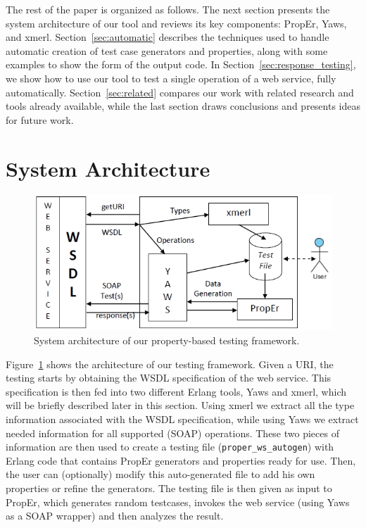 \documentclass[submission,copyright]{eptcs}
\begin{document}

The rest of the paper is organized as follows.
The next section presents the system architecture of our tool and
reviews its key components: PropEr, Yaws, and xmerl.
Section~\ref{sec:automatic} describes the techniques used to handle
automatic creation of test case generators and properties, along with
some examples to show the form of the output code.
In Section~\ref{sec:response_testing}, we show how to use our tool to
test a single operation of a web service, fully automatically.
Section~\ref{sec:related} compares our work with related research and
tools already available, while the last section draws conclusions and
presents ideas for future work.

\section{System Architecture} \label{sec:architecture}

\begin{figure}[!b]
\centering
\includegraphics[height=.245\textheight]{Framework.png}
\caption{System architecture of our property-based testing framework.}
\label{fig:architecture}
\end{figure}

Figure~\ref{fig:architecture} shows the architecture of our testing
framework. Given a URI, the testing starts by obtaining the WSDL
specification of the web service. This specification is then fed into
two different Erlang tools, Yaws and xmerl, which will be briefly
described later in this section. Using xmerl we extract all the type
information associated with the WSDL specification, while using Yaws
we extract needed information for all supported (SOAP) operations.
These two pieces of information are then used to create a testing file
(\texttt{proper\_ws\_autogen}) with Erlang code that contains PropEr
generators and properties ready for use. Then, the user can
(optionally) modify this auto-generated file to add his own properties
or refine the generators. The testing file is then given as input to
PropEr, which generates random testcases, invokes the web service
(using Yaws as a SOAP wrapper) and then analyzes the result.
\end{document}
